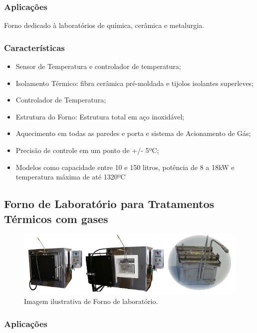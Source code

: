 \subsubsection{Aplicações}

Forno dedicado à laboratórios de química, cerâmica e metalurgia.

\subsubsection{Características}

\begin{itemize}
	\item Sensor de Temperatura e controlador de temperatura;
	\item Isolamento Térmico: fibra cerâmica pré-moldada e tijolos isolantes superleves;
	\item Controlador de Temperatura;
	\item Estrutura do Forno: Estrutura total em aço inoxidável;
	\item Aquecimento em todas as paredes e porta e sistema de Acionamento de Gás;
	\item Precisão de controle em um ponto de +/- 5ºC; 
	\item Modelos como capacidade entre 10 e 150 litros, potência de 8 a 18kW e temperatura máxima de até 1320ºC
\end{itemize}

\subsection{Forno de Laboratório para Tratamentos Térmicos com gases}

\begin{figure}[!h]
	\centering
	\label{forno_gases}
	\includegraphics[keepaspectratio=true,scale=0.8]{figuras/forno_gases.JPG}
	\caption{Imagem ilustrativa de Forno de laboratório.}
\end{figure}

\subsubsection{Aplicações}


